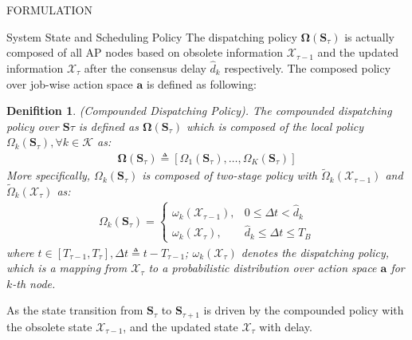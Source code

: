 \documentclass[10pt, conference, letterpaper]{IEEEtran}
\newtheorem{definition}{Denifition}
\newcommand{\define}{\triangleq}
\renewcommand{\vec}{\mathbf}
\newcommand{\apSet}{\mathcal{K}}
\newcommand{\Stat}{\mathbf{S}}
\newcommand{\Obsv}{\mathcal{X}}
\newcommand{\Policy}{\mathbf{\Omega}}
\begin{document}
\begin{section}{FORMULATION}
\begin{subsection}{System State and Scheduling Policy}
            The dispatching policy $\vec{\Omega}(\Stat_\tau)$ is actually composed of all AP nodes based on obsolete information $\Obsv_{\tau-1}$ and the updated information $\Obsv_{\tau}$ after the consensus delay $\hat{d}_k$ respectively. The composed policy over job-wise action space $\vec{a}$ is defined as following:
            \begin{definition}(Compounded Dispatching Policy).
                The compounded dispatching policy over $\Stat\tau$ is defined as $\Policy(\Stat_\tau)$ which is composed of the local policy $\Omega_k(\Stat_\tau), \forall k\in\apSet$ as:
                \begin{align}
                    \vec{\Omega}(\Stat_\tau) \triangleq [\Omega_1(\Stat_\tau), \dots, \Omega_K(\Stat_\tau)]
                \end{align}
                More specifically, $\Omega_k(\Stat_\tau)$ is composed of two-stage policy with $\tilde{\Omega}_k(\Obsv_{\tau-1})$ and $\tilde{\Omega}_k(\Obsv_{\tau})$ as:
                \begin{align}
                    \Omega_k(\Stat_\tau) = 
                    \begin{cases}
                        {\omega}_k(\Obsv_{\tau-1}), & 0 \leq \Delta{t} < \hat{d}_k
                        \\
                        {\omega}_k(\Obsv_{\tau}), & \hat{d}_k \leq \Delta{t} \leq T_B
                    \end{cases}
                \end{align}
                where $t\in[T_{\tau-1}, T_{\tau}] ,\Delta{t} \define t - T_{\tau-1}$; ${\omega}_k(\Obsv_\tau)$ denotes the dispatching policy, which is a mapping from $\Obsv_\tau$ to a probabilistic distribution over action space $\vec{a}$ for $k$-th node.
            \end{definition}

            As the state transition from $\Stat_{\tau}$ to $\Stat_{\tau+1}$ is driven by the compounded policy with the obsolete state $\Obsv_{\tau-1}$, and the updated state $\Obsv_{\tau}$ with delay.
        \end{subsection}


\end{section}
\end{document}
